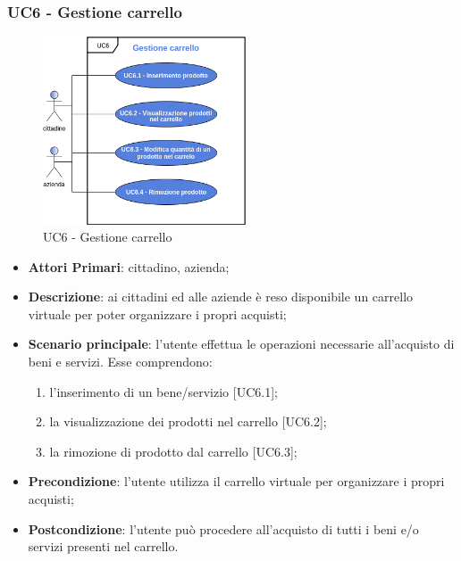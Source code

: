 \subsubsection{UC6 - Gestione carrello}
 \begin{figure}[h]
	\includegraphics[width=6cm]{res/images/UC6GestioneCarrello.png}
	\centering
	\caption{UC6 - Gestione carrello}
\end{figure}
\begin{itemize}
	\item \textbf{Attori Primari}: cittadino, azienda;
	\item \textbf{Descrizione}: ai cittadini ed alle aziende è reso disponibile un carrello virtuale per poter organizzare i propri acquisti;
	\item \textbf{Scenario principale}: l'utente effettua le operazioni necessarie all'acquisto di beni e servizi. Esse comprendono:
	\begin{enumerate}[label=\alph*.]
		\item l'inserimento di un bene/servizio [UC6.1];
		\item la visualizzazione dei prodotti nel carrello [UC6.2];
		\item la rimozione di prodotto dal carrello [UC6.3];
	\end{enumerate}
	\item \textbf{Precondizione}: l'utente utilizza il carrello virtuale per organizzare i propri acquisti;
	\item \textbf{Postcondizione}: l'utente può procedere all'acquisto di tutti i beni e/o servizi presenti nel carrello.
\end{itemize} 
